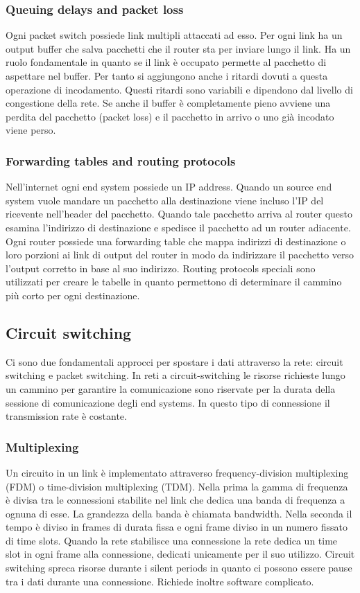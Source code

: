 \subsubsection{Queuing delays and packet loss}
Ogni packet switch possiede link multipli attaccati ad esso. Per ogni link ha un output buffer che salva pacchetti che il router sta per inviare lungo il link. Ha un ruolo fondamentale in quanto se il link \`e occupato
permette al pacchetto di aspettare nel buffer. Per tanto si aggiungono anche i ritardi dovuti a questa operazione di incodamento. Questi ritardi sono variabili e dipendono dal livello di congestione della rete.
Se anche il buffer \`e completamente pieno avviene una perdita del pacchetto (packet loss) e il pacchetto in arrivo o uno gi\`a incodato viene perso. 
\subsubsection{Forwarding tables and routing protocols}
Nell'internet ogni end system possiede un IP address. Quando un source end system vuole mandare un pacchetto alla destinazione viene incluso l'IP del ricevente nell'header del pacchetto. Quando tale 
pacchetto arriva al router questo esamina l'indirizzo di destinazione e spedisce il pacchetto ad un router adiacente. Ogni router possiede una forwarding table che mappa indirizzi di destinazione o loro porzioni 
ai link di output del router in modo da indirizzare il pacchetto verso l'output corretto in base al suo indirizzo. Routing protocols speciali sono utilizzati per creare le tabelle in quanto permettono di determinare
il cammino pi\`u corto per ogni destinazione.
\subsection{Circuit switching}
Ci sono due fondamentali approcci per spostare i dati attraverso la rete: circuit switching e packet switching. In reti a circuit-switching le risorse richieste lungo un cammino per garantire la comunicazione sono
riservate per la durata della sessione di comunicazione degli end systems. In questo tipo di connessione il transmission rate \`e costante. 
\subsubsection{Multiplexing}
Un circuito in un link \`e implementato attraverso frequency-division multiplexing (FDM) o time-division multiplexing (TDM). Nella prima la gamma di frequenza \`e divisa tra le connessioni stabilite nel link che
dedica una banda di frequenza a ognuna di esse. La grandezza della banda \`e chiamata bandwidth. Nella seconda il tempo \`e diviso in frames di durata fissa e ogni frame diviso in un numero fissato di time 
slots. Quando la rete stabilisce una connessione la rete dedica un time slot in ogni frame alla connessione, dedicati unicamente per il suo utilizzo. Circuit switching spreca risorse durante i silent periods in 
quanto ci possono essere pause tra i dati durante una connessione. Richiede inoltre software complicato. 
